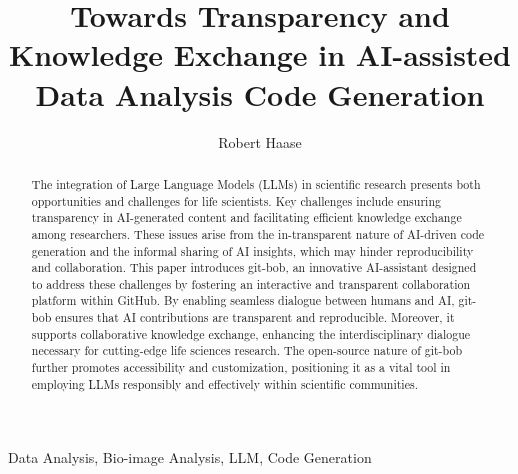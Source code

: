 \documentclass[times, twoside]{zHenriquesLab-StyleBioRxiv}
\begin{document}
\title{Towards Transparency and Knowledge Exchange in AI-assisted Data Analysis Code Generation}

\author[1,2,3,\Letter]{Robert Haase}


\maketitle

\begin{abstract}

The integration of Large Language Models (LLMs) in scientific research presents both opportunities and challenges for life scientists. Key challenges include ensuring transparency in AI-generated content and facilitating efficient knowledge exchange among researchers. These issues arise from the in-transparent nature of AI-driven code generation and the informal sharing of AI insights, which may hinder reproducibility and collaboration. This paper introduces git-bob, an innovative AI-assistant designed to address these challenges by fostering an interactive and transparent collaboration platform within GitHub. By enabling seamless dialogue between humans and AI, git-bob ensures that AI contributions are transparent and reproducible. Moreover, it supports collaborative knowledge exchange, enhancing the interdisciplinary dialogue necessary for cutting-edge life sciences research. The open-source nature of git-bob further promotes accessibility and customization, positioning it as a vital tool in employing LLMs responsibly and effectively within scientific communities.

\end {abstract}

\begin{keywords}
Data Analysis, Bio-image Analysis, LLM, Code Generation
\end{keywords}
\end{document}
